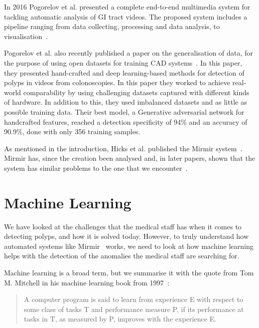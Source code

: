 In 2016 Pogorelov et al. presented a complete end-to-end multimedia system for tackling automatic analysis of GI tract videos. The proposed system includes a pipeline ranging from data collecting, processing and data analysis, to visualisation~\cite{Pogorelov2017}. 

Pogorelov et al. also recently published a paper on the generalisation of data, for the purpose of using open datasets for training CAD systems~\cite{pogorelov2018deep}. In this paper, they presented hand-crafted and deep learning-based methods for detection of polyps in videos from colonoscopies. In this paper they worked to achieve real-world comparability by using challenging datasets captured with different kinds of hardware. In addition to this, they used imbalanced datasets and as little as possible training data.
Their best model, a Generative adversarial network for handcrafted features, reached a detection specificity of 94\% and an accuracy of 90.9\%, done with only 356 training samples.

As mentioned in the introduction, Hicks et al. published the Mirmir system~\cite{25953}. 
Mirmir has, since the creation been analysed and, in later papers, shown that the system has similar problems to the one that we encounter~\cite{25956}.  



    
\section{Machine Learning}
We have looked at the challenges that the medical staff has when it comes to detecting polyps, and how it is solved today.
However, to truly understand how automated systems like Mirmir~\cite{25953} works, we need to look at how machine learning helps with the detection of the anomalies the medical staff are searching for.  

Machine learning is a broad term, but we summarise it with the quote from  Tom M. Mitchell in his machine learning book from 1997~\cite{MitchellTomM1997Ml}:\\
\vspace{10px}

\begin{quote}
 A computer program is said to learn from experience E with respect to some class of tasks T and performance measure P, if its performance at tasks in T, as measured by P, improves with the experience E.

\end{quote} 
\label{ML}



